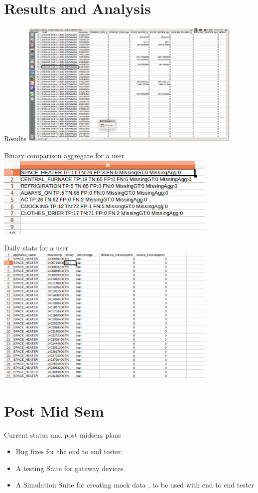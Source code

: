 \documentclass[xcolor=svgnames,handout]{beamer}
\begin{document}
    \section{Results and Analysis}
    \begin{frame}{Results}
      \includegraphics[width=0.8\textwidth]{aggregate}
    \end{frame}
    \begin{frame}{Binary comparison aggregate for a user}
      \includegraphics[width=0.8\textwidth]{result_binary}
    \end{frame}
    \begin{frame}{Daily stats for a user}
      \includegraphics[width=0.8\textwidth]{results_daily}
    \end{frame}
    
    \section{Post Mid Sem}
    \begin{frame}{Current status and post midsem plans}
      \begin{itemize}
        \item Bug fixes for the end to end tester.
        \item A testing Suite for gateway devices.
        \item A Simulation Suite for creating mock data , to be used with
          end to end tester
      \end{itemize}

    \end{frame}
    
\end{document}
